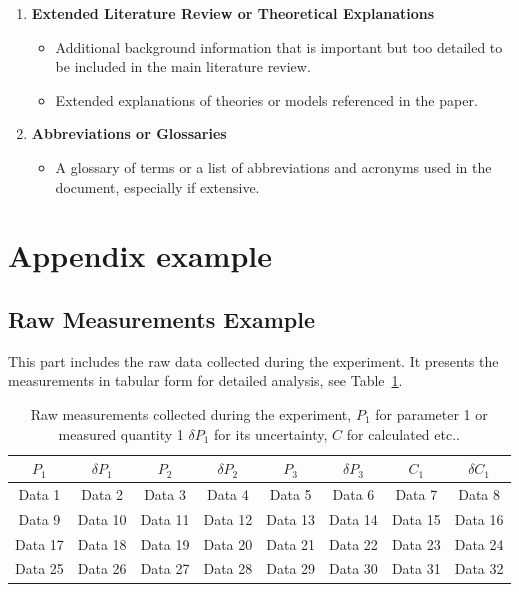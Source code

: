\documentclass[a4paper, twocolumn]{article}
\begin{document}
\begin{enumerate}
    \item \textbf{Extended Literature Review or Theoretical Explanations}
    \begin{itemize}
        \item Additional background information that is important but too detailed to be included in the main literature review.
        \item Extended explanations of theories or models referenced in the paper.
    \end{itemize}

    \item \textbf{Abbreviations or Glossaries}
    \begin{itemize}
        \item A glossary of terms or a list of abbreviations and acronyms used in the document, especially if extensive.
    \end{itemize}
    
\end{enumerate}

\section{Appendix example} \label{app:C}
\subsection{Raw Measurements Example}
This part includes the raw data collected during the experiment. It presents the measurements in tabular form for detailed analysis, see Table~\ref{tab:raw_measurements}.
\begin{table}[h!t]
    \centering
    \caption{Raw measurements collected during the experiment, $P_1$ for parameter 1 or measured quantity 1 $\delta P_1$ for its uncertainty, $C$ for calculated etc..}
    \begin{tabular}{|c|c|c|c|c|c|c|c|}
        \hline
        $P_1$  & $\delta P_1$ & $P_2$  & $\delta P_2$ & $P_3$  & $\delta P_3$ & $C_1$  & $\delta C_1$ \\ 
        \hline
        Data 1   & Data 2   & Data 3   & Data 4   & Data 5   & Data 6   & Data 7   & Data 8   \\ 
        Data 9   & Data 10  & Data 11  & Data 12  & Data 13  & Data 14  & Data 15  & Data 16  \\ 
        Data 17  & Data 18  & Data 19  & Data 20  & Data 21  & Data 22  & Data 23  & Data 24  \\ 
        Data 25  & Data 26  & Data 27  & Data 28  & Data 29  & Data 30  & Data 31  & Data 32  \\ 
        \hline
    \end{tabular}
    \label{tab:raw_measurements}
\end{table}
\end{document}

